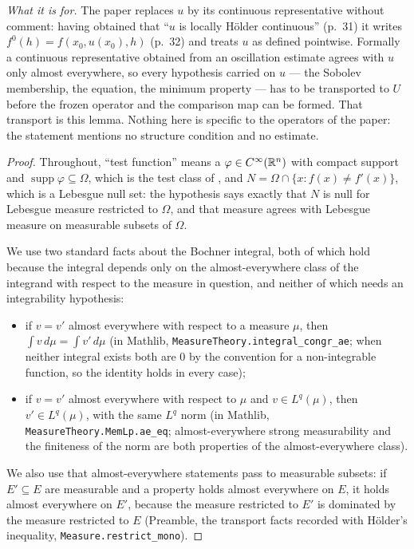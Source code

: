 \begin{lemma}
\medskip
\emph{What it is for.}  The paper replaces $u$ by its continuous representative
without comment: having obtained that ``$u$ is locally H\"older continuous''
(p.~31) it writes $f^0(h)=f(x_0,u(x_0),h)$ (p.~32) and treats $u$ as defined
pointwise.  Formally a continuous representative obtained from an oscillation
estimate agrees with $u$ only almost everywhere, so
every hypothesis carried on $u$ --- the Sobolev membership, the equation, the
minimum property --- has to be transported to $U$ before the frozen operator and
the comparison map can be formed.  That transport is this lemma.  Nothing here
is specific to the operators of the paper: the statement mentions no structure
condition and no estimate.
\end{lemma}
\begin{proof}
Throughout, ``test function'' means a $\varphi\in C^\infty(\mathbb{R}^n)$ with compact
support and $\operatorname{supp}\varphi\subseteq\Omega$, which is the test class
of , and $N=\Omega\cap\{x:f(x)\ne f'(x)\}$, which is
a Lebesgue null set: the hypothesis says exactly that $N$ is null for Lebesgue
measure restricted to $\Omega$, and that measure agrees with Lebesgue measure on
measurable subsets of $\Omega$.

We use two standard facts about the Bochner integral, both of which hold because
the integral depends only on the almost-everywhere class of the integrand with
respect to the measure in question, and neither of which needs an integrability
hypothesis:
\begin{itemize}
\item[(A1)] if $v=v'$ almost everywhere with respect to a measure $\mu$, then
  $\int v\,d\mu=\int v'\,d\mu$ (in Mathlib,
  \texttt{MeasureTheory.integral\_congr\_ae}; when neither integral exists both
  are $0$ by the convention for a non-integrable function, so the identity holds
  in every case);
\item[(A2)] if $v=v'$ almost everywhere with respect to $\mu$ and
  $v\in L^{q}(\mu)$, then $v'\in L^{q}(\mu)$, with the same $L^q$ norm
  (in Mathlib, \texttt{MeasureTheory.MemLp.ae\_eq}; almost-everywhere strong
  measurability and the finiteness of the norm are both properties of the
  almost-everywhere class).
\end{itemize}
We also use that almost-everywhere statements pass to measurable subsets: if
$E'\subseteq E$ are measurable and a property holds almost everywhere on $E$,
it holds almost everywhere on $E'$, because the measure restricted to $E'$ is
dominated by the measure restricted to $E$ (Preamble, the transport facts
recorded with H\"older's inequality, \texttt{Measure.restrict\_mono}).


\end{proof}
